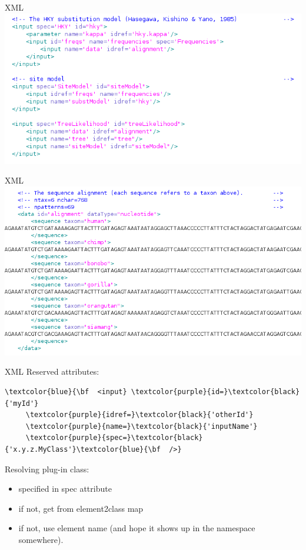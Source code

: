 \documentclass{beamer}
\theoremstyle{definition}
\begin{document}
\begin{frame}{XML}
\includegraphics[width=1.25\textwidth]{xml1.png}
\end{frame}
\begin{frame}{XML}
\includegraphics[width=1.25\textwidth]{xml2.png}
\end{frame}


\begin{frame}[containsverbatim]
{\Large XML}
Reserved attributes:
\begin{Verbatim}[commandchars=\\\{\}]
\textcolor{blue}{\bf  <input} \textcolor{purple}{id=}\textcolor{black}{'myId'} 
     \textcolor{purple}{idref=}\textcolor{black}{'otherId'} 
     \textcolor{purple}{name=}\textcolor{black}{'inputName'} 
     \textcolor{purple}{spec=}\textcolor{black}{'x.y.z.MyClass'}\textcolor{blue}{\bf  />}
\end{Verbatim}
\vskip0.5cm
Resolving plug-in class:
\begin{itemize}
\item specified in spec attribute
\item if not, get from element2class map
\item if not, use element name (and hope it shows up in the namespace somewhere).
\end{itemize}
\end{frame}
\end{document}
